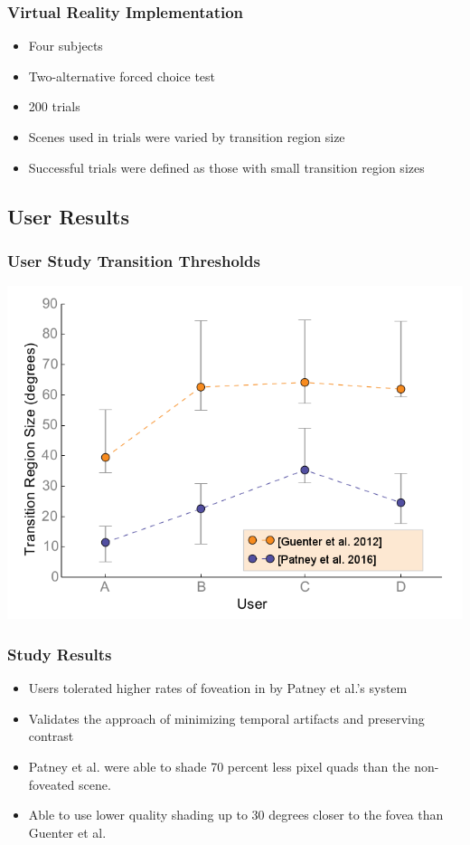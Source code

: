 \documentclass{beamer}
\begin{document}
\begin{frame}
  \frametitle{Virtual Reality Implementation}
	\begin{itemize}
		\item Four subjects
		\item Two-alternative forced choice test 
		\item 200 trials
		\item Scenes used in trials were varied by transition region size
		\item Successful trials were defined as those with small transition region sizes

	\end{itemize}
\end{frame}

\subsection{User Results}


\begin{frame}
  \frametitle{User Study Transition Thresholds}
  
  	\begin{center}
    		\includegraphics[width=.70\textwidth]{Illustrations/transition_region_Patney.png}
  	\end{center}
  
\end{frame}

\begin{frame}
  \frametitle{Study Results}
	\begin{itemize}
		\item Users tolerated higher rates of foveation in by Patney et al.'s system
		\item Validates the approach of minimizing temporal artifacts and preserving contrast
		\item Patney et al. were able to shade 70 percent less pixel quads than the non-foveated scene.
		\item Able to use lower quality shading up to 30 degrees closer to the fovea than Guenter et al.
	\end{itemize}
\end{frame}
\end{document}
